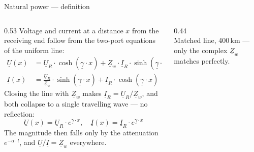 \begin{frame}{Natural power --- definition}
  \begin{columns}[T,onlytextwidth]
    \begin{column}{0.53\textwidth}
      {\small Voltage and current at a distance $x$ from the receiving end
      follow from the two-port equations of the uniform line:}
      \[ \begin{aligned}
        \underline{U}(x) &= \underline{U}_R\cdot\cosh\!\left(\underline{\gamma}\cdot x\right)
                          + \underline{Z}_w\cdot\underline{I}_R\cdot\sinh\!\left(\underline{\gamma}\cdot x\right)\\[0.15em]
        \underline{I}(x) &= \frac{\underline{U}_R}{\underline{Z}_w}\cdot\sinh\!\left(\underline{\gamma}\cdot x\right)
                          + \underline{I}_R\cdot\cosh\!\left(\underline{\gamma}\cdot x\right)
      \end{aligned} \]
      {\small Closing the line with $\underline{Z}_w$ makes
      $\underline{I}_R=\underline{U}_R/\underline{Z}_w$, and both collapse to a
      single travelling wave --- no reflection:}
      \[ \underline{U}(x)=\underline{U}_R\cdot e^{\underline{\gamma}\cdot x},
         \quad
         \underline{I}(x)=\underline{I}_R\cdot e^{\underline{\gamma}\cdot x} \]
      {\small The magnitude then falls only by the attenuation
      $e^{-\alpha\cdot l}$, and $\underline{U}/\underline{I}=\underline{Z}_w$
      everywhere.}
    \end{column}
    \begin{column}{0.44\textwidth}\centering
      \\[0.25em]
      {\color{atGray}\footnotesize Matched line, 400\,km --- only the
      complex $\underline{Z}_w$ matches perfectly.}
    \end{column}
  \end{columns}
\end{frame}

